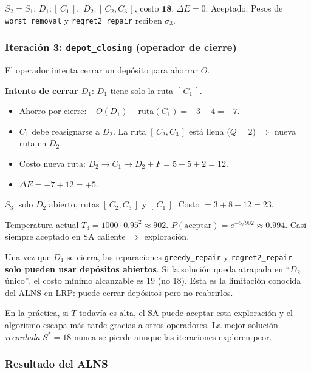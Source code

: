\documentclass[12pt,a4paper]{article}
\begin{document}
$S_2 = S_1$: $D_1:[\,C_1\,]$,\ $D_2:[\,C_2,C_3\,]$, costo $\mathbf{18}$.
$\Delta E = 0$. Aceptado. Pesos de \texttt{worst\_removal} y \texttt{regret2\_repair} reciben $\sigma_3$.

\subsubsection*{Iteración 3: \texttt{depot\_closing} (operador de cierre)}

El operador intenta cerrar un depósito para ahorrar $O$.

\textbf{Intento de cerrar $D_1$}: $D_1$ tiene solo la ruta $[\,C_1\,]$.
\begin{itemize}[noitemsep]
  \item Ahorro por cierre: $-O(D_1) - \text{ruta}(C_1) = -3 - 4 = -7$.
  \item $C_1$ debe reasignarse a $D_2$. La ruta $[\,C_2,C_3\,]$ está llena ($Q=2$) $\Rightarrow$ nueva ruta en $D_2$.
  \item Costo nueva ruta: $D_2\!\to\!C_1\!\to\!D_2 + F = 5+5+2 = 12$.
  \item $\Delta E = -7 + 12 = +5$.
\end{itemize}

$S_3$: solo $D_2$ abierto, rutas $[\,C_2,C_3\,]$ y $[\,C_1\,]$. Costo $= 3+8+12 = 23$.

Temperatura actual $T_3 = 1000\cdot0.95^2 \approx 902$.
$P(\text{aceptar}) = e^{-5/902} \approx 0.994$. Casi siempre aceptado en SA caliente $\Rightarrow$ exploración.

\begin{nota}
Una vez que $D_1$ se cierra, las reparaciones \texttt{greedy\_repair} y \texttt{regret2\_repair} \textbf{solo pueden usar depósitos abiertos}. Si la solución queda atrapada en ``$D_2$ único'', el costo mínimo alcanzable es 19 (no 18). Esta es la limitación conocida del ALNS en LRP: puede cerrar depósitos pero no reabrirlos.

En la práctica, si $T$ todavía es alta, el SA puede aceptar esta exploración y el algoritmo escapa más tarde gracias a otros operadores. La mejor solución \textit{recordada} $S^* = 18$ nunca se pierde aunque las iteraciones exploren peor.
\end{nota}

\subsubsection*{Resultado del ALNS}
\end{document}
